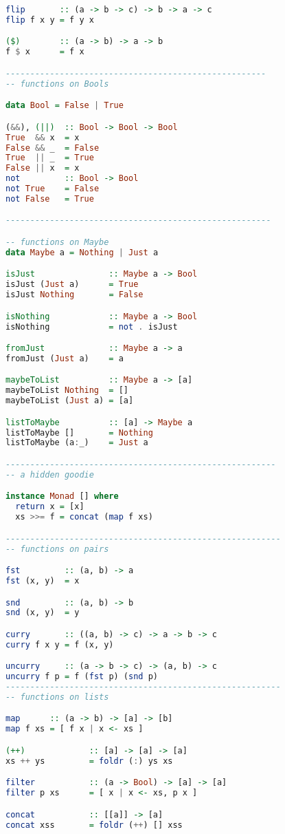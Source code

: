 \documentclass[a4paper]{article}
\begin{document}
\begin{lstlisting}[numbers=none, multicols=2,language=Haskell]
flip       :: (a -> b -> c) -> b -> a -> c
flip f x y = f y x

($)        :: (a -> b) -> a -> b 
f $ x      = f x

-----------------------------------------------------
-- functions on Bools 

data Bool = False | True

(&&), (||)  :: Bool -> Bool -> Bool
True  && x  = x
False && _  = False
True  || _  = True
False || x  = x
not         :: Bool -> Bool
not True    = False
not False   = True

------------------------------------------------------

-- functions on Maybe
data Maybe a = Nothing | Just a

isJust               :: Maybe a -> Bool
isJust (Just a)      = True
isJust Nothing       = False

isNothing            :: Maybe a -> Bool
isNothing            = not . isJust

fromJust             :: Maybe a -> a
fromJust (Just a)    = a

maybeToList          :: Maybe a -> [a]
maybeToList Nothing  = []
maybeToList (Just a) = [a]

listToMaybe          :: [a] -> Maybe a
listToMaybe []       = Nothing
listToMaybe (a:_)    = Just a

-------------------------------------------------------
-- a hidden goodie

instance Monad [] where
  return x = [x]
  xs >>= f = concat (map f xs)

--------------------------------------------------------
-- functions on pairs

fst         :: (a, b) -> a 
fst (x, y)  = x

snd         :: (a, b) -> b
snd (x, y)  = y

curry       :: ((a, b) -> c) -> a -> b -> c
curry f x y = f (x, y)

uncurry     :: (a -> b -> c) -> (a, b) -> c
uncurry f p = f (fst p) (snd p)
--------------------------------------------------------
-- functions on lists

map      :: (a -> b) -> [a] -> [b] 
map f xs = [ f x | x <- xs ]

(++)             :: [a] -> [a] -> [a] 
xs ++ ys         = foldr (:) ys xs

filter           :: (a -> Bool) -> [a] -> [a] 
filter p xs      = [ x | x <- xs, p x ]

concat           :: [[a]] -> [a]
concat xss       = foldr (++) [] xss


\end{lstlisting}
\end{document}
